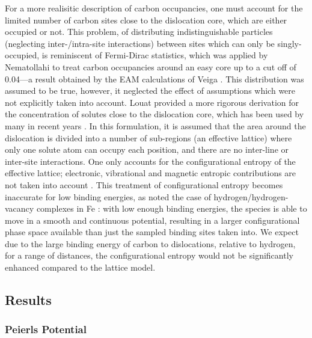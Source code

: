 \documentclass[a4paper,11pt]{article}
\numberwithin{equation}{chapter}
\numberwithin{listing}{chapter}
\begin{document}
For a more realisitic description of carbon occupancies, one must account
for the limited number of carbon sites close to the dislocation core, which
are either occupied or not. This problem, of distributing indistinguishable
particles (neglecting inter-/intra-site interactions) between sites which
can only be singly-occupied, is reminiscent of Fermi-Dirac statistics, which
was applied by Nematollahi \cite{Nematollahi2016} to treat carbon occupancies
around an easy core up to a cut off of 0.04---a result obtained by the EAM
calculations of Veiga \cite{Veiga2011}. This distribution was assumed to be
true, however, it neglected the effect of assumptions which were not
explicitly taken into account. Louat \cite{Louat1956} provided a more rigorous
derivation for the concentration of solutes close to the dislocation core,
which has been used by many in recent years
\cite{Ventelon2015,Treglia1999,mclean1957grain,Veiga2013,Luthi2019}. In this
formulation, it is assumed that the area around the dislocation is divided
into a number of sub-regions (an effective lattice) where only one solute
atom can occupy each position, and there are no inter-line or inter-site
interactions. One only accounts for the configurational entropy of the
effective lattice; electronic, vibrational and magnetic entropic
contributions are not taken into account \cite{Ventelon2015}. This treatment
of configurational entropy becomes inaccurate for low binding energies, as
noted the case of hydrogen/hydrogen-vacancy complexes in Fe
\cite{Davidson2020}: with low enough binding energies, the species is able to
move in a smooth and continuous potential, resulting in a larger
configurational phase space available than just the sampled binding sites
taken into. We expect due to the large binding energy of carbon to
dislocations, relative to hydrogen, for a range of distances, the
configurational entropy would not be significantly enhanced compared to the lattice model.


\subsection{Results}
\label{sec:org4856e98}

\subsubsection{Peierls Potential}
\label{sec:orgfc87037}
\end{document}

